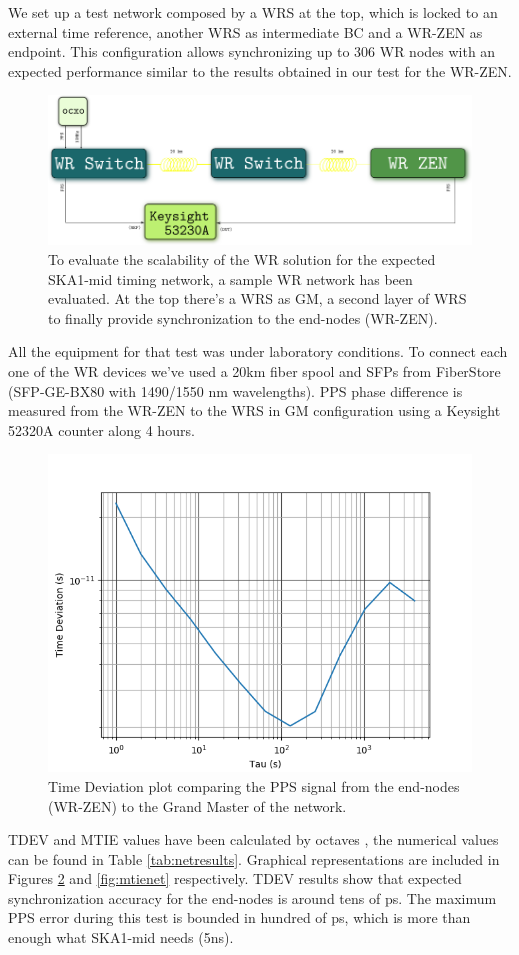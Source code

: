We set up a test network composed by a WRS at the top, which is locked to an 
external time reference, another WRS as intermediate BC and a WR-ZEN as 
endpoint. This configuration allows synchronizing up to 306 WR nodes with an 
expected performance similar to the results obtained in our test for the WR-ZEN.

\begin{figure}
	\centering
	\includegraphics[width=0.7\linewidth]{img/prueba_red}
	\caption[WR Scalability test's setup for SKA]{To evaluate the scalability 
	of the WR solution for the expected SKA1-mid timing network, a sample WR 
	network has been evaluated. At the top there's a WRS as GM, a second layer 
	of WRS to finally provide synchronization to the end-nodes (WR-ZEN).}
	\label{fig:pruebared}
\end{figure}


All the equipment for that test was under laboratory conditions. To connect 
each one of the WR devices we've used a 20km fiber spool and SFPs from 
FiberStore (SFP-GE-BX80 with 1490/1550 nm wavelengths). PPS phase difference is 
measured from the WR-ZEN to the WRS in GM configuration using a Keysight 52320A 
counter along 4 hours.

\begin{figure}
	\centering
	\includegraphics[width=0.5\linewidth]{img/tdev_exp3}
	\caption[TDEV of the end-nodes in the scalability test.]{Time Deviation 
	plot comparing the PPS signal from the end-nodes (WR-ZEN) to the Grand 
	Master of the network.}
	\label{fig:tdevnet}
\end{figure}

TDEV and MTIE values have been calculated by octaves  , the numerical 
values can 
be found in Table \ref{tab:netresults}. Graphical representations are included 
in Figures \ref{fig:tdevnet} and \ref{fig:mtienet} respectively. TDEV results 
show that expected synchronization accuracy for the end-nodes is around tens of 
ps. The maximum PPS error during this test is bounded in hundred of ps, which 
is more than enough what SKA1-mid needs (5ns).

